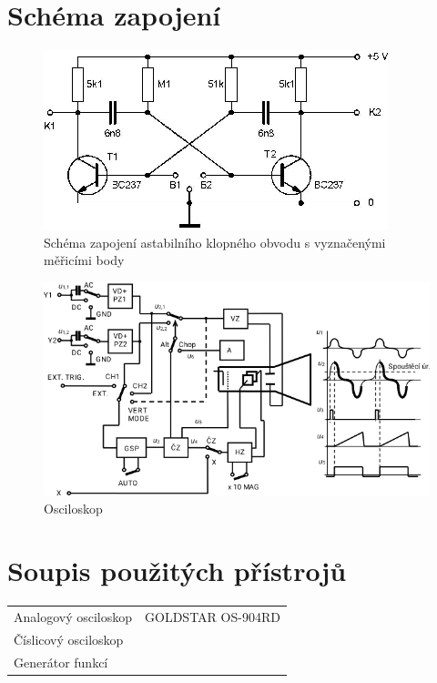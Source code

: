 \documentclass[5pt]{article}
\begin{document}
\section{Schéma zapojení­}
\begin{figure}[htp]
    \centering
    \includegraphics[scale=1.00]{scheme.png}
    \caption{Schéma zapojení astabilního klopného obvodu s vyznačenými měřicími body}
\end{figure}
\begin{figure}[htp]
    \centering
    \includegraphics[scale=0.8]{block.png}
    \caption{Osciloskop}
\end{figure}

\section{Soupis použitých přístrojů}

\begin{tabular}{ll}
	Analogový osciloskop & GOLDSTAR OS-904RD\\
	Číslicový osciloskop\\
	Generátor funkcí
\end{tabular}
\end{document}
